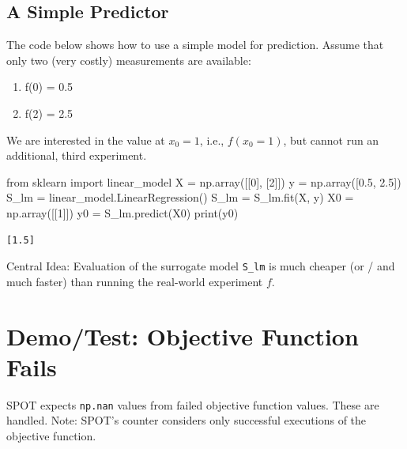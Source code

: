 \documentclass[
  letterpaper,
  DIV=11,
  numbers=noendperiod]{scrreprt}
\newenvironment{Shaded}{\begin{snugshade}}{\end{snugshade}}
\newcommand{\BuiltInTok}[1]{\textcolor[rgb]{0.00,0.23,0.31}{#1}}
\newcommand{\DecValTok}[1]{\textcolor[rgb]{0.68,0.00,0.00}{#1}}
\newcommand{\FloatTok}[1]{\textcolor[rgb]{0.68,0.00,0.00}{#1}}
\newcommand{\ImportTok}[1]{\textcolor[rgb]{0.00,0.46,0.62}{#1}}
\newcommand{\NormalTok}[1]{\textcolor[rgb]{0.00,0.23,0.31}{#1}}
\newcommand{\OperatorTok}[1]{\textcolor[rgb]{0.37,0.37,0.37}{#1}}
\providecommand{\tightlist}{%
  \setlength{\itemsep}{0pt}\setlength{\parskip}{0pt}}\usepackage{longtable,booktabs,array}
\begin{document}
\subsection{A Simple Predictor}\label{a-simple-predictor-1}

The code below shows how to use a simple model for prediction. Assume
that only two (very costly) measurements are available:

\begin{enumerate}
\def\labelenumi{\arabic{enumi}.}
\tightlist
\item
  f(0) = 0.5
\item
  f(2) = 2.5
\end{enumerate}

We are interested in the value at \(x_0 = 1\), i.e., \(f(x_0 = 1)\), but
cannot run an additional, third experiment.

\begin{Shaded}
\begin{Highlighting}[]
\ImportTok{from}\NormalTok{ sklearn }\ImportTok{import}\NormalTok{ linear\_model}
\NormalTok{X }\OperatorTok{=}\NormalTok{ np.array([[}\DecValTok{0}\NormalTok{], [}\DecValTok{2}\NormalTok{]])}
\NormalTok{y }\OperatorTok{=}\NormalTok{ np.array([}\FloatTok{0.5}\NormalTok{, }\FloatTok{2.5}\NormalTok{])}
\NormalTok{S\_lm }\OperatorTok{=}\NormalTok{ linear\_model.LinearRegression()}
\NormalTok{S\_lm }\OperatorTok{=}\NormalTok{ S\_lm.fit(X, y)}
\NormalTok{X0 }\OperatorTok{=}\NormalTok{ np.array([[}\DecValTok{1}\NormalTok{]])}
\NormalTok{y0 }\OperatorTok{=}\NormalTok{ S\_lm.predict(X0)}
\BuiltInTok{print}\NormalTok{(y0)}
\end{Highlighting}
\end{Shaded}

\begin{verbatim}
[1.5]
\end{verbatim}

Central Idea: Evaluation of the surrogate model \texttt{S\_lm} is much
cheaper (or / and much faster) than running the real-world experiment
\(f\).

\section{Demo/Test: Objective Function
Fails}\label{demotest-objective-function-fails}

SPOT expects \texttt{np.nan} values from failed objective function
values. These are handled. Note: SPOT's counter considers only
successful executions of the objective function.
\end{document}
